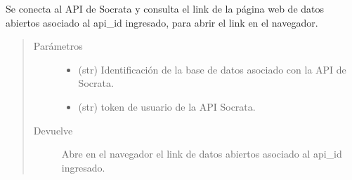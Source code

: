 \documentclass[letterpaper,10pt,openany,spanish]{sphinxmanual}
\begin{document}
\begin{fulllineitems}
\label{\detokenize{metadatos:metadatos.pagina_metadatos}}
Se conecta al API de Socrata y consulta el link de la página web de datos abiertos asociado al api\_id ingresado, para abrir el link en el navegador.
\begin{quote}\begin{description}
\item[{Parámetros}] \leavevmode\begin{itemize}
\item {} 
 \textendash{} (str) Identificación de la base de datos asociado con la API de Socrata.

\item {} 
 \textendash{} (str)  \sphinxhyphen{} token de usuario de la API Socrata.

\end{itemize}

\item[{Devuelve}] \leavevmode
Abre en el navegador el link de datos abiertos asociado al api\_id ingresado.

\end{description}\end{quote}

\end{fulllineitems}

\end{document}
